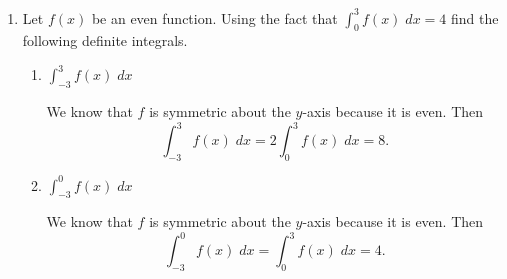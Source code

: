 \documentclass[11pt]{article}
\newcommand{\ds}{\displaystyle}
\begin{document}
\begin{enumerate}
  \newpage

\item Let $f(x)$ be an even function.  Using the fact that
  $\ds\int_0^3 f(x)\;dx = 4$ find the following definite integrals.
  \begin{enumerate}
  \item $\ds\int_{-3}^3 f(x)\;dx$
    \vfill
    {\color{blue}

      We know that $f$ is symmetric about the $y$-axis because it is
      even. Then
      \[
      \int_{-3}^3 f(x)\;dx = 2\int_{0}^3 f(x)\;dx = 8.
      \]
      
    }
    \vfill
  \item $\ds\int_{-3}^0 f(x)\;dx$
    \vfill
    {\color{blue}

      We know that $f$ is symmetric about the $y$-axis because it is
      even. Then
      \[
      \int_{-3}^0 f(x)\;dx = \int_{0}^3 f(x)\;dx = 4.
      \]
      
    }
     \vfill
  \end{enumerate}

\end{enumerate}
\end{document}
